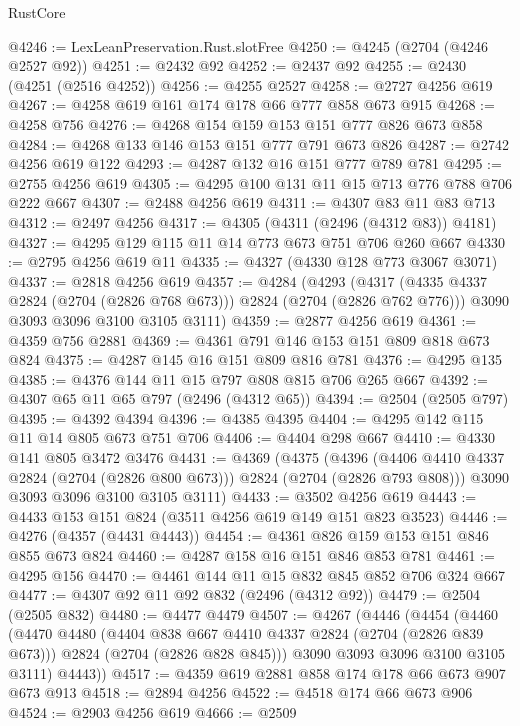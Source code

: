 \begin{lexlean}{RustCore}
\begin{coremodule}
@4246 := LexLeanPreservation.Rust.slotFree
@4250 := @4245 (@2704 (@4246 @2527 @92))
@4251 := @2432 @92
@4252 := @2437 @92
@4255 := @2430 (@4251 (@2516 @4252))
@4256 := @4255 @2527
@4258 := @2727 @4256 @619
@4267 := @4258 @619 @161 @174 @178 @66 @777 @858 @673 @915
@4268 := @4258 @756
@4276 := @4268 @154 @159 @153 @151 @777 @826 @673 @858
@4284 := @4268 @133 @146 @153 @151 @777 @791 @673 @826
@4287 := @2742 @4256 @619 @122
@4293 := @4287 @132 @16 @151 @777 @789 @781
@4295 := @2755 @4256 @619
@4305 := @4295 @100 @131 @11 @15 @713 @776 @788 @706 @222 @667
@4307 := @2488 @4256 @619
@4311 := @4307 @83 @11 @83 @713
@4312 := @2497 @4256
@4317 := @4305 (@4311 (@2496 (@4312 @83)) @4181)
@4327 := @4295 @129 @115 @11 @14 @773 @673 @751 @706 @260 @667
@4330 := @2795 @4256 @619 @11
@4335 := @4327 (@4330 @128 @773 @3067 @3071)
@4337 := @2818 @4256 @619
@4357 := @4284
    (@4293
      (@4317 (@4335 @4337 @2824 (@2704 (@2826 @768 @673))) @2824 (@2704 (@2826 @762 @776)))
      @3090
      @3093
      @3096
      @3100
      @3105
      @3111)
@4359 := @2877 @4256 @619
@4361 := @4359 @756 @2881
@4369 := @4361 @791 @146 @153 @151 @809 @818 @673 @824
@4375 := @4287 @145 @16 @151 @809 @816 @781
@4376 := @4295 @135
@4385 := @4376 @144 @11 @15 @797 @808 @815 @706 @265 @667
@4392 := @4307 @65 @11 @65 @797 (@2496 (@4312 @65))
@4394 := @2504 (@2505 @797)
@4395 := @4392 @4394
@4396 := @4385 @4395
@4404 := @4295 @142 @115 @11 @14 @805 @673 @751 @706
@4406 := @4404 @298 @667
@4410 := @4330 @141 @805 @3472 @3476
@4431 := @4369
    (@4375
      (@4396 (@4406 @4410 @4337 @2824 (@2704 (@2826 @800 @673))) @2824 (@2704 (@2826 @793 @808)))
      @3090
      @3093
      @3096
      @3100
      @3105
      @3111)
@4433 := @3502 @4256 @619
@4443 := @4433 @153 @151 @824 (@3511 @4256 @619 @149 @151 @823 @3523)
@4446 := @4276 (@4357 (@4431 @4443))
@4454 := @4361 @826 @159 @153 @151 @846 @855 @673 @824
@4460 := @4287 @158 @16 @151 @846 @853 @781
@4461 := @4295 @156
@4470 := @4461 @144 @11 @15 @832 @845 @852 @706 @324 @667
@4477 := @4307 @92 @11 @92 @832 (@2496 (@4312 @92))
@4479 := @2504 (@2505 @832)
@4480 := @4477 @4479
@4507 := @4267
    (@4446
      (@4454
        (@4460
          (@4470
            @4480
            (@4404 @838 @667 @4410 @4337 @2824 (@2704 (@2826 @839 @673)))
            @2824
            (@2704 (@2826 @828 @845)))
          @3090
          @3093
          @3096
          @3100
          @3105
          @3111)
        @4443))
@4517 := @4359 @619 @2881 @858 @174 @178 @66 @673 @907 @673 @913
@4518 := @2894 @4256
@4522 := @4518 @174 @66 @673 @906
@4524 := @2903 @4256 @619
@4666 := @2509

\end{coremodule}
\end{lexlean}
